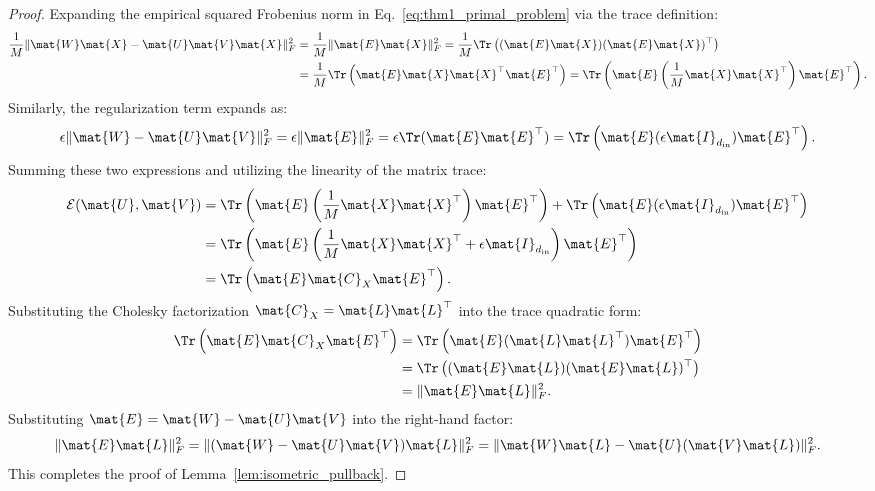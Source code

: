 \begin{proof}
Expanding the empirical squared Frobenius norm in Eq.~\eqref{eq:thm1_primal_problem} via the trace definition:
\begin{align}
\frac{1}{M} \|\mat{W} \mat{X} - \mat{U} \mat{V} \mat{X}\|_F^2 &= \frac{1}{M} \|\mat{E} \mat{X}\|_F^2 = \frac{1}{M} \Tr\left( (\mat{E} \mat{X}) (\mat{E} \mat{X})^\top \right) \nonumber \\
&= \frac{1}{M} \Tr\left( \mat{E} \mat{X} \mat{X}^\top \mat{E}^\top \right) = \Tr\left( \mat{E} \left(\frac{1}{M} \mat{X} \mat{X}^\top\right) \mat{E}^\top \right).
\end{align}
Similarly, the regularization term expands as:
\begin{equation}
\epsilon \|\mat{W} - \mat{U} \mat{V}\|_F^2 = \epsilon \|\mat{E}\|_F^2 = \epsilon \Tr(\mat{E} \mat{E}^\top) = \Tr\left( \mat{E} (\epsilon \mat{I}_{d_{\text{in}}}) \mat{E}^\top \right).
\end{equation}
Summing these two expressions and utilizing the linearity of the matrix trace:
\begin{align}
\mathcal{E}(\mat{U}, \mat{V}) &= \Tr\left( \mat{E} \left(\frac{1}{M} \mat{X} \mat{X}^\top\right) \mat{E}^\top \right) + \Tr\left( \mat{E} (\epsilon \mat{I}_{d_{\text{in}}}) \mat{E}^\top \right) \nonumber \\
&= \Tr\left( \mat{E} \left( \frac{1}{M} \mat{X} \mat{X}^\top + \epsilon \mat{I}_{d_{\text{in}}} \right) \mat{E}^\top \right) \nonumber \\
&= \Tr\left( \mat{E} \mat{C}_X \mat{E}^\top \right).
\end{align}
Substituting the Cholesky factorization $\mat{C}_X = \mat{L} \mat{L}^\top$ into the trace quadratic form:
\begin{align}
\Tr\left( \mat{E} \mat{C}_X \mat{E}^\top \right) &= \Tr\left( \mat{E} (\mat{L} \mat{L}^\top) \mat{E}^\top \right) \nonumber \\
&= \Tr\left( (\mat{E} \mat{L}) (\mat{E} \mat{L})^\top \right) \nonumber \\
&= \|\mat{E} \mat{L}\|_F^2.
\end{align}
Substituting $\mat{E} = \mat{W} - \mat{U} \mat{V}$ into the right-hand factor:
\begin{equation}
\|\mat{E} \mat{L}\|_F^2 = \|(\mat{W} - \mat{U} \mat{V}) \mat{L}\|_F^2 = \|\mat{W} \mat{L} - \mat{U} (\mat{V} \mat{L})\|_F^2.
\end{equation}
This completes the proof of Lemma~\ref{lem:isometric_pullback}.
\end{proof}

